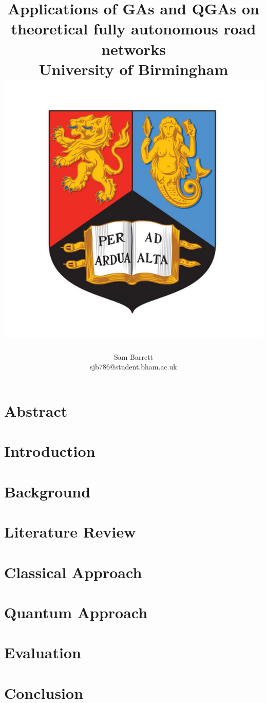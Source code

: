 \documentclass[11pt]{report}
\title{
	{Applications of GAs and QGAs on theoretical fully autonomous road networks} \\
	{\large University of Birmingham} \\
	{\includegraphics[scale=0.3]{uobcrest.jpg}}
}
\author{Sam Barrett \\ sjb786@student.bham.ac.uk}
\begin{document}
\maketitle

\tableofcontents
\newpage

\chapter*{Abstract}

\chapter{Introduction}

\chapter{Background}

\chapter{Literature Review}

\chapter{Classical Approach}

\chapter{Quantum Approach}

\chapter{Evaluation}

\chapter{Conclusion}




\end{document}
